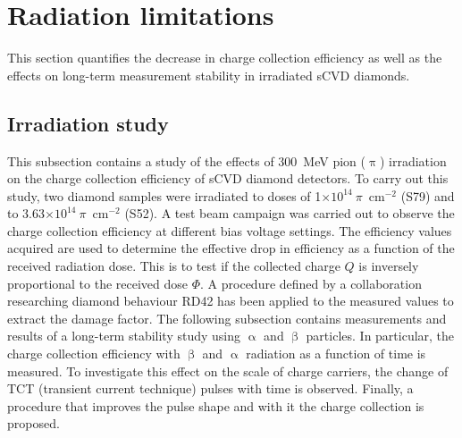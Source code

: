 \clearpage
\section{Radiation limitations}
\label{sec:radlimit}
This section quantifies the decrease in charge collection efficiency as well as the effects on long-term measurement stability in irradiated sCVD diamonds.


\subsection{Irradiation study}
This subsection contains a study of the effects of 300~MeV pion ($\uppi$) irradiation on the charge collection efficiency of sCVD diamond detectors. To carry out this study, two diamond samples were irradiated to doses of 1$\times10^{14}~\pi$~cm$^{-2}$ (S79) and to 3.63$\times10^{14}~\pi$~cm$^{-2}$ (S52). A test beam campaign was carried out to observe the charge collection efficiency at different bias voltage settings. The efficiency values acquired are used to determine the effective drop in efficiency as a function of the received radiation dose. This is to test if the collected charge $Q$ is inversely proportional to the received dose $\Phi$. A procedure defined by a collaboration researching diamond behaviour RD42 has been applied to the measured values to extract the damage factor.
The following subsection contains measurements and results of a long-term stability study using $\upalpha$ and $\upbeta$ particles. In particular, the charge collection efficiency with $\upbeta$ and $\upalpha$ radiation as a function of time is measured. To investigate this effect on the scale of charge carriers, the change of TCT (transient current technique) pulses with time is observed. Finally, a procedure that improves the pulse shape and with it the charge collection is proposed.



